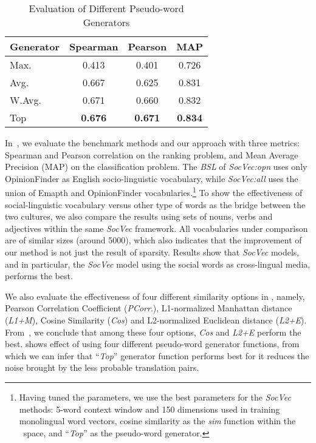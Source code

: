 \begin{table}[th]
	\centering
	\small
	\caption{{Evaluation of Different Pseudo-word Generators}}
	\begin{tabular}{|l|c|c|c|}
		\hline
		\textbf{Generator} & \textbf{Spearman} & \textbf{Pearson}   & \textbf{MAP} \\ \hline \hline
		Max. & 0.413 & 0.401 & 0.726\\ 
		Avg. & 0.667 & 0.625 & 0.831\\ 
		W.Avg. & 0.671 & 0.660 & 0.832 \\  
		Top & \textbf{0.676} & \textbf{0.671} & \textbf{0.834} \\ \hline
	\end{tabular}
	\label{tab:mcdne_res_3}
\end{table}

In~, we evaluate the benchmark methods and 
our approach with three metrics: Spearman and 
Pearson correlation on the ranking problem, and Mean Average Precision (MAP)
on the classification problem. 
The \textit{BSL} of \textit{SocVec:opn} uses only OpinionFinder as English socio-linguistic vocabulary, while \textit{SocVec:all} uses the union of Emapth and OpinionFinder vocabularies.\footnote{Having tuned the  parameters, we use the best parameters for the \textit{SocVec} methods: 5-word context window and 
150 dimensions used in training monolingual word vectors,
cosine similarity as the \textit{sim} function within the 
\textit{\socvec}~space, and ``\textit{Top}'' as the pseudo-word generator.} 
To show the effectiveness of social-linguistic vocabulary versus other type
of words as the bridge between the two cultures, we also compare the
results using sets of nouns, verbs and adjectives within the 
same \textit{SocVec} framework.
All vocabularies under comparison are of similar sizes 
(around 5000), which also indicates that the improvement of our method 
is not just the result of sparsity.
Results show that \textit{SocVec} models, and in particular, the
\textit{SocVec} model using the social words as cross-lingual media, 
performs the best. 

We also evaluate the effectiveness of four different similarity options in 
\textit{\socvec}, namely, Pearson Correlation Coefficient 
(\textit{PCorr}.), L1-normalized Manhattan distance (\textit{L1+M}), 
Cosine Similarity (\textit{Cos}) and  L2-normalized Euclidean distance (\textit{L2+E}).
From~, we conclude that among these four options, \textit{Cos} and \textit{L2+E} perform the best. 
 shows effect of using four different 
pseudo-word generator functions, from which we can infer that ``\textit{Top}'' generator function performs best for 
it reduces the noise brought by the less probable translation pairs. 

